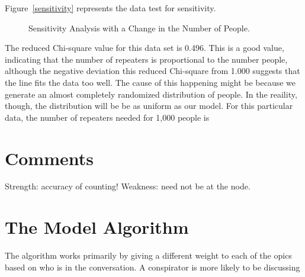 \documentclass{icmmcm}
\begin{document}
Figure~\ref{sensitivity} represents the data test for sensitivity.
\begin{figure}[ht]
\begin{center}
\end{center}
\caption[Sensitivity of the Model]{Sensitivity Analysis with a Change in the Number of People.\label{sensitivity}}%
\label{fig:sensitivity}
\end{figure}
The reduced Chi-square value for this data set is 0.496. This is a good value, indicating that the number of repeaters is proportional to the number people, although the negative deviation this reduced Chi-square from 1.000 suggests that the line fits the data too well. The cause of this happening might be because we generate an almost completely randomized distribution of people. In the reaility, though, the distribution will be be as uniform as our model. For this particular data, the number of repeaters needed for 1,000 people is 
\section{Comments}
Strength: accuracy of counting!
Weakness: need not be at the node.

\section{The Model Algorithm}
The algorithm works primarily by giving a different weight to each of the 
opics based on who is in the conversation. 
A conspirator is more likely to be discussing 
\end{document}
